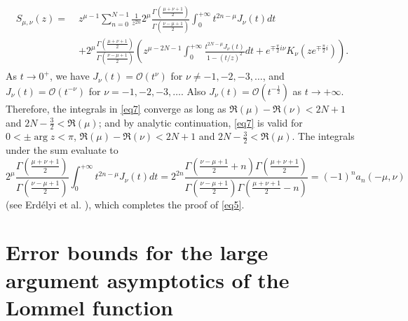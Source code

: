 \documentclass[a4paper,twoside,10pt]{amsart}
\numberwithin{equation}{section}
\begin{document}
\begin{gather}\label{eq7}
\begin{split}
S_{\mu ,\nu } \left( z \right) = \; & z^{\mu  - 1} \sum\limits_{n = 0}^{N - 1} {\frac{1}{{z^{2n} }}2^\mu  \frac{{\Gamma \left( {\frac{{\mu  + \nu  + 1}}{2}} \right)}}{{\Gamma \left( {\frac{{\nu  - \mu  + 1}}{2}} \right)}}\int_0^{ + \infty } {t^{2n - \mu } J_\nu  \left( t \right)dt} } 
\\ & + 2^\mu  \frac{{\Gamma \left( {\frac{{\mu  + \nu  + 1}}{2}} \right)}}{{\Gamma \left( {\frac{{\nu  - \mu  + 1}}{2}} \right)}}\left( {z^{\mu  - 2N - 1} \int_0^{ + \infty } {\frac{{t^{2N - \mu } J_\nu  \left( t \right)}}{{1 - \left( {t/z} \right)^2 }}dt}  + e^{ \mp \frac{\pi }{2}i\nu } K_\nu  \left( {ze^{ \mp \frac{\pi }{2}i} } \right)} \right) .
\end{split}
\end{gather}
As $t\to 0^+$, we have $J_\nu  \left( t \right) = \mathcal{O}\left( t^\nu \right)$ for $\nu \neq -1,-2,-3,\ldots$, and $J_\nu  \left( t \right) = \mathcal{O}\left( t^{-\nu} \right)$ for $\nu = -1,-2,-3,\ldots$. Also $J_\nu  \left( t \right) = \mathcal{O}\left( t^{ - \frac{1}{2} } \right)$ as $t\to +\infty$. Therefore, the integrals in \eqref{eq7} converge as long as $\Re \left( \mu  \right) - \Re \left( \nu  \right)< 2N + 1$ and $2N - \frac{3}{2} < \Re \left( \mu  \right)$; and by analytic continuation, \eqref{eq7} is valid for $0 < \pm \arg z <\pi$, $\Re \left( \mu  \right) - \Re \left( \nu  \right)< 2N + 1$ and $2N - \frac{3}{2} < \Re \left( \mu  \right)$. The integrals under the sum evaluate to
\[
2^\mu  \frac{{\Gamma \left( {\frac{{\mu  + \nu  + 1}}{2}} \right)}}{{\Gamma \left( {\frac{{\nu  - \mu  + 1}}{2}} \right)}}\int_0^{ + \infty } {t^{2n - \mu } J_\nu  \left( t \right)dt}  = 2^{2n} \frac{{\Gamma \left( {\frac{{\nu  - \mu  + 1}}{2} + n} \right)\Gamma \left( {\frac{{\mu  + \nu  + 1}}{2}} \right)}}{{\Gamma \left( {\frac{{\nu  - \mu  + 1}}{2}} \right)\Gamma \left( {\frac{{\mu  + \nu  + 1}}{2} - n} \right)}} = \left( { - 1} \right)^n a_n \left( { - \mu ,\nu } \right)
\]
(see Erd\'elyi et al. \cite[p. 326, entry (1)]{Erdelyi1}), which completes the proof of \eqref{eq5}.

\section{Error bounds for the large argument asymptotics of the Lommel function}\label{section3}
\end{document}
